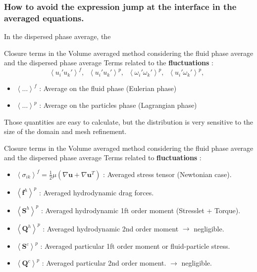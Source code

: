 \documentclass[aspectratio=169]{beamer}
\begin{document}
\begin{frame}
  \frametitle{How to avoid the expression jump at the interface in the averaged equations.}
  In the dispersed phase average, the 
  

\end{frame}

\begin{frame}{Closure terms in the Volume averaged method considering the fluid phase average and the dispersed phase average}
  Terms related to the \textbf{fluctuations} : 
  \begin{equation}
    \left<u_i'u_k'\right>^f,
    \;\;\left<u_i'u_k'\right>^p,
    \;\;\left<\omega_i'\omega_k'\right>^p,
    \;\;\left<u_i'\omega_k'\right>^p,\;\;
  \end{equation}    
  \begin{itemize}
    \item $\left<\ldots\right>^f$ : Average on the fluid phase (Eulerian phase)
    \item $\left<\ldots\right>^p$ : Average on the particles phase (Lagrangian phase)
  \end{itemize}
  Those quantities are easy to calculate, but the distribution is very sensitive to the size of the domain and mesh refinement.
\end{frame}



\begin{frame}{Closure terms in the Volume averaged method considering the fluid phase average and the dispersed phase average}
  Terms related to \textbf{fluctuations} : 
  \begin{itemize}
    \item $\left<\sigma_{ik}\right>^f = \frac{1}{2}\mu(\nabla\bm{u}+\nabla\bm{u}^T)$ : Averaged stress tensor (Newtonian case).  
    \item $\left<\bm{f}^h\right>^p$ : Averaged hydrodynamic drag forces.  
    \item $\left<\bm{S}^h\right>^p$ : Averaged hydrodynamic 1ft order moment (Stresslet + Torque).  
    \item $\left<\bm{Q}^h\right>^p$ : Averaged hydrodynamic 2nd order moment $\rightarrow$ negligible.  
    \item $\left<\bm{S}^c\right>^p$ : Averaged particular 1ft order moment \citep{nott2011suspension} \citet{zhang2021ensemble} or fluid-particle stress.  
    \item $\left<\bm{Q}^c\right>^p$ : Averaged particular 2nd order moment. $\rightarrow$ negligible.
  \end{itemize}    
\end{frame}
\end{document}
